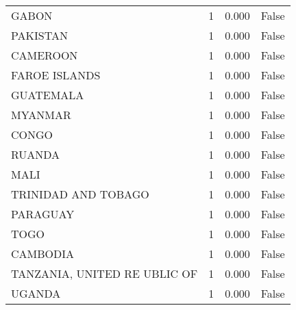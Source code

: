 \begin{tabular}{lrrr}
GABON & 1 & 0.000 & False \\
PAKISTAN & 1 & 0.000 & False \\
CAMEROON & 1 & 0.000 & False \\
FAROE ISLANDS & 1 & 0.000 & False \\
GUATEMALA & 1 & 0.000 & False \\
MYANMAR & 1 & 0.000 & False \\
CONGO & 1 & 0.000 & False \\
RUANDA & 1 & 0.000 & False \\
MALI & 1 & 0.000 & False \\
TRINIDAD AND TOBAGO & 1 & 0.000 & False \\
PARAGUAY & 1 & 0.000 & False \\
TOGO & 1 & 0.000 & False \\
CAMBODIA & 1 & 0.000 & False \\
TANZANIA, UNITED RE UBLIC OF & 1 & 0.000 & False \\
UGANDA & 1 & 0.000 & False \\
\bottomrule
\end{tabular}
